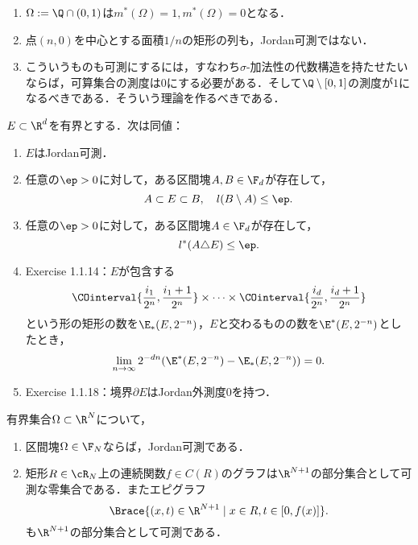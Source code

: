 \documentclass[uplatex, dvipdfmx]{jsreport}
\begin{document}
\begin{example}\mbox{}
    \begin{enumerate}
        \item $\Omega:=\Q\cap(0,1)$は$m^*(\Omega)=1,m^*(\Omega)=0$となる．
        \item 点$(n,0)$を中心とする面積$1/n$の矩形の列も，Jordan可測ではない．
        \item こういうものも可測にするには，すなわち$\sigma$-加法性の代数構造を持たせたいならば，可算集合の測度は$0$にする必要がある．そして$\Q\setminus[0,1]$の測度が$1$になるべきである．そういう理論を作るべきである．
    \end{enumerate}
\end{example}

\begin{theorem}
    $E\subset\R^d$を有界とする．次は同値：
    \begin{enumerate}
        \item $E$はJordan可測．
        \item 任意の$\ep>0$に対して，ある区間塊$A,B\in\F_d$が存在して，
        \[A\subset E\subset B,\quad l(B\setminus A)\le\ep.\]
        \item 任意の$\ep>0$に対して，ある区間塊$A\in\F_d$が存在して，
        \[l^*(A\triangle E)\le\ep.\]
        \item \cite{Tao11-MeasureTheory} Exercise 1.1.14：$E$が包含する
        \[\COinterval{\frac{i_1}{2^n},\frac{i_1+1}{2^n}}\times\cdots\times\COinterval{\frac{i_d}{2^n},\frac{i_d+1}{2^n}}\]
        という形の矩形の数を$\E_*(E,2^{-n})$，$E$と交わるものの数を$\E^*(E,2^{-n})$としたとき，
        \[\lim_{n\to\infty}2^{-dn}(\E^*(E,2^{-n})-\E_*(E,2^{-n}))=0.\]
        \item \cite{Tao11-MeasureTheory} Exercise 1.1.18：境界$\partial E$はJordan外測度$0$を持つ．
    \end{enumerate}
\end{theorem}

\begin{theorem}[Jordan可測であるための十分条件]
    有界集合$\Omega\subset\R^N$について，
    \begin{enumerate}
        \item 区間塊$\Omega\in\F_N$ならば，Jordan可測である．
        \item 矩形$R\in\cR_N$上の連続関数$f\in C(R)$のグラフは$\R^{N+1}$の部分集合として可測な零集合である．またエピグラフ
        \[\Brace{(x,t)\in\R^{N+1}\mid x\in R,t\in[0,f(x)]}.\]
        も$\R^{N+1}$の部分集合として可測である．
    \end{enumerate}
\end{theorem}
\end{document}
